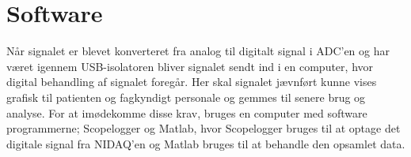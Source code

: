\section{Software}
Når signalet er blevet konverteret fra analog til digitalt signal i ADC’en og har været igennem USB-isolatoren bliver signalet sendt ind i en computer, hvor digital behandling af signalet foregår. Her skal signalet jævnført \pageref{} kunne vises grafisk til patienten og fagkyndigt personale og gemmes til senere brug og analyse. For at imødekomme disse krav, bruges en computer med software programmerne; Scopelogger og Matlab, hvor Scopelogger bruges til at optage det  digitale signal fra NIDAQ'en og Matlab bruges til at behandle den opsamlet data. 


